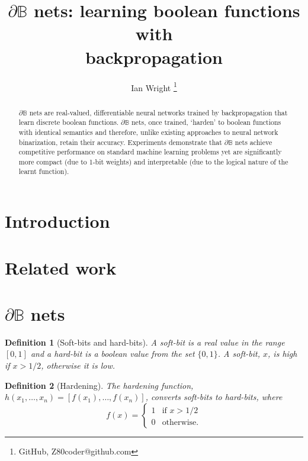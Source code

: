 \documentclass{article} %
\title{$\partial\mathbb{B}$ nets: learning boolean functions with\\backpropagation}
\author{Ian Wright \thanks{GitHub, Z80coder@github.com}
}
\newtheorem*{definition}{Definition}
\begin{document}
\maketitle

\begin{abstract}
	$\partial\mathbb{B}$ nets are real-valued, differentiable neural networks 
	trained by backpropagation that learn discrete boolean functions.
	$\partial\mathbb{B}$ nets, once trained, `harden' to boolean functions with identical semantics and therefore, unlike existing approaches to neural network binarization, retain their accuracy. Experiments demonstrate that $\partial\mathbb{B}$ nets achieve competitive performance on standard machine learning problems yet are significantly more compact (due to 1-bit weights) and interpretable (due to the logical nature of the learnt function).
\end{abstract}

\section{Introduction}

\section{Related work}

\section{$\partial\mathbb{B}$ nets}

\begin{definition}[Soft-bits and hard-bits]
A {\em soft-bit} is a real value in the range $[0,1]$ and a {\em hard-bit} is a boolean value from the set $\{0,1\}$. A soft-bit, $x$, is {\em high} if $x>1/2$, otherwise it is {\em low}.
\end{definition}

\begin{definition}[Hardening]
The {\em hardening} function, $h(x_{1}, \dots, x_{n}) = [f(x_{1}), \dots, f(x_{n})]$, converts soft-bits to hard-bits, where
\begin{equation*}
f(x) =
\begin{cases}
1 & \text{if } x > 1/2 \\
0 & \text{otherwise.}
\end{cases}
\end{equation*}
\end{definition}
\end{document}
